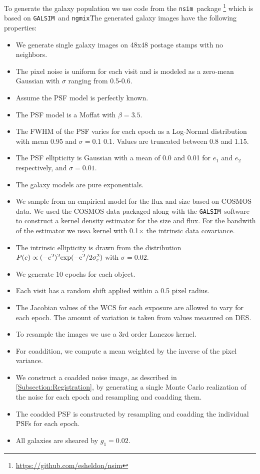 \documentclass[fleqn,useAMS,usenatbib]{mnras}
\newcommand{\galsim}{\texttt{GALSIM}}
\newcommand{\ngmix}{\texttt{ngmix}}
\newcommand{\nnsim}{\texttt{nsim}}
\begin{document}
To generate the galaxy population we use code from the \nnsim\ package \footnote{\url{https://github.com/esheldon/nsim}} which is based on \galsim\ and \ngmix\.  The generated galaxy images have the following properties:
\begin{itemize}
\item We generate single galaxy images on 48x48 postage stamps with no neighbors.
\item The pixel noise is uniform for each visit and is modeled as a zero-mean Gaussian with $\sigma$ ranging from 0.5-0.6.
\item Assume the PSF model is perfectly known.
\item The PSF model is a Moffat with $\beta=3.5$.
\item The \textsf{FWHM} of the PSF varies for each epoch as a Log-Normal distribution with mean 0.95 and $\sigma=0.1$ 0.1.  Values are truncated between 0.8 and 1.15.
\item The PSF ellipticity is Gaussian with a mean of 0.0 and 0.01 for $e_1$ and $e_2$ respectively, and $\sigma=0.01$.
\item The galaxy models are pure exponentials.  
\item We sample from an empirical model for the flux and size based on \textsf{COSMOS} data.  We used the \textsf{COSMOS} data packaged along with the \galsim\ software to construct a kernel density estimator for the size and flux.  For the bandwith of the estimator we usea kernel with 0.1$\times$ the intrinsic data covariance.  
\item The intrinsic ellipticity is drawn from the distribution $P(e) \propto (-e^2)^2 \rm{exp}(-e^2/2\sigma_e^2)$ with $\sigma=0.02$.
\item We generate 10 epochs for each object.  
\item Each visit has a random shift applied within a 0.5 pixel radius.
\item The Jacobian values of the WCS for each exposure are allowed to vary for each epoch.  The amount of variation is taken from values measured on DES.
\item To resample the images we use a 3rd order Lanczos kernel.
\item For coaddition, we compute a mean weighted by the inverse of the pixel variance.
\item We construct a coadded noise image, as described in \ref{Subsection:Registration}, by generating a single Monte Carlo realization of the noise for each epoch and resampling and coadding them.
\item The coadded PSF is constructed by resampling and coadding the individual PSFs for each epoch.
\item All galaxies are sheared by $g_1=0.02$.
\end{itemize}
\end{document}

